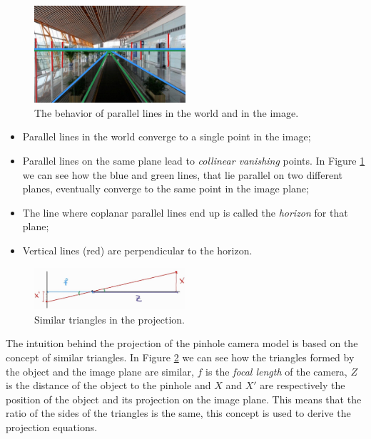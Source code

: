 \begin{figure}[H]
    \centering
    \includegraphics[width=0.5\textwidth]{Figures/horizon.jpg}
    \caption{The behavior of parallel lines in the world and in the image.}
    \label{fig:horizon}
\end{figure}
\begin{itemize}
    \item Parallel lines in the world converge to a single point in the image;
    \item Parallel lines on the same plane lead to \textit{collinear vanishing} points. In Figure \ref{fig:horizon} we can see how the blue and green lines, that lie parallel on two different planes, eventually converge to the same point in the image plane;
    \item The line where coplanar parallel lines end up is called the \textit{horizon} for that plane;
    \item Vertical lines (red) are perpendicular to the horizon.
\end{itemize}

\begin{figure}[H]
    \centering
    \includegraphics[width=0.5\textwidth]{Figures/triangles.jpg}
    \caption{Similar triangles in the projection.}
    \label{fig:triangles}
\end{figure}

The intuition behind the projection of the pinhole camera model is based on the concept of similar triangles. In Figure \ref{fig:triangles} we can see how the triangles formed by the object and the image plane are similar, \(f\) is the \textit{focal length} of the camera, \(Z\) is the distance of the object to the pinhole and \(X\) and \(X'\) are respectively the position of the object and its projection on the image plane. This means that the ratio of the sides of the triangles is the same, this concept is used to derive the projection equations. 

